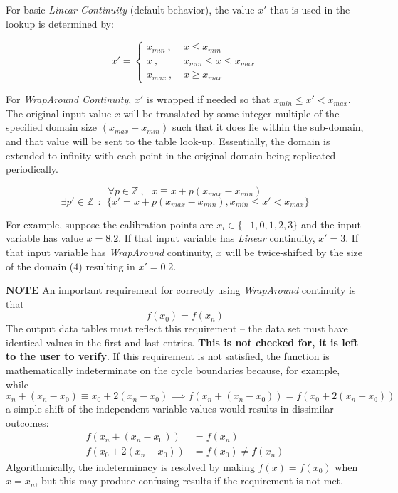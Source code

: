 \documentclass[11pt,fleqn]{report}
\begin{document}
 For basic \textit{Linear Continuity} (default behavior), the value $x'$ that
 is used in the lookup is determined by:

 \begin{equation*} \label{eq1}
  x' = \begin{cases}
         x_{min} ~,~ & x \leqslant x_{min} \\
         x       ~,~ & x_{min} \leqslant x \leqslant x_{max} \\
         x_{max} ~,~ & x \geqslant x_{max}
       \end{cases}
 \end{equation*}


 For \textit{WrapAround Continuity}, $x'$ is wrapped if needed so that
 $x_{min} \leq x' < x_{max}$.
 The original input value $x$ will be translated by some integer multiple
 of the specified domain size $(x_{max} - x_{min})$ such
 that it does lie within the sub-domain, and that value will be sent
 to the table look-up.  Essentially, the domain is extended to infinity with
 each point in the original domain being replicated periodically.

 \begin{equation*}
   \forall p \in \mathbb{Z} ~,~ ~~  x \equiv x + p(x_{max} - x_{min})
 \end{equation*}
 \begin{equation*}
   \exists p' \in \mathbb{Z} ~~:~~ \{x' =  x + p(x_{max} - x_{min}), x_{min}
   \leqslant x' < x_{max}\}
 \end{equation*}

 For example, suppose the calibration points are
 $x_i \in \{ -1, 0, 1, 2, 3\}$ and the
 input variable has value $x = 8.2$.
 If that input variable has \textit{Linear} continuity, $x' = 3$.
 If that input variable has \textit{WrapAround} continuity, $x$ will be
 twice-shifted by the size of the domain ($4$) resulting in $x' = 0.2$.

 \textbf{NOTE }An important requirement for correctly using
 \textit{WrapAround} continuity is that
 \begin{equation*}
  f(x_0) = f(x_n)
 \end{equation*}
 The output data tables must reflect this requirement -- the data set
 must have identical values in the first and last entries.
 \textbf{This is not checked for, it is left to the user to verify}.
 If this requirement is not satisfied, the function is mathematically
 indeterminate on the cycle boundaries because, for example,
 while
 \begin {equation*}
  x_n + (x_n - x_0) \equiv x_0 + 2(x_n - x_0) \implies
  f(x_n + (x_n - x_0)) = f(x_0 + 2 (x_n - x_0))
 \end{equation*}
 a simple shift of the independent-variable values would results in dissimilar
 outcomes:
 \begin{align*}
  f(x_n + (x_n - x_0)) &= f(x_n) \\
  f(x_0 + 2 (x_n - x_0)) &= f(x_0) \neq f(x_n)
 \end{align*}
 Algorithmically, the indeterminacy is resolved by making $f(x) = f(x_0)$ when
 $x=x_n$, but this may produce confusing results if the requirement is not met.
\end{document}

